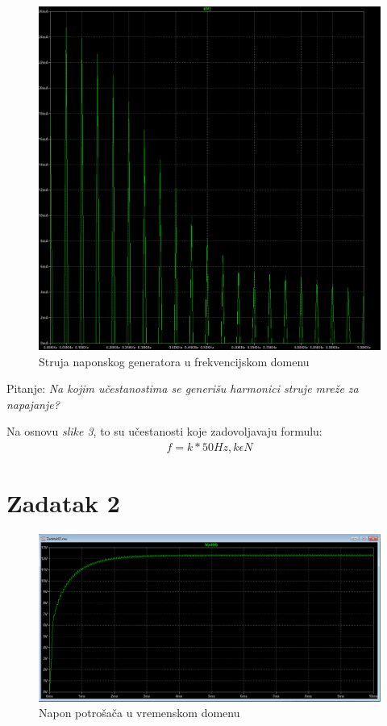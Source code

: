 \documentclass{article}
\begin{document}
\begin{figure}[H]
    \begin{center}
        \includegraphics[width=\textwidth]{Zadatak01_3.png}
        \caption[]{Struja naponskog generatora u frekvencijskom domenu}
    \end{center}
\end{figure}

Pitanje: \emph{Na kojim učestanostima se generišu harmonici struje mreže za napajanje?\\}

Na osnovu \emph{slike 3}, to su učestanosti koje zadovoljavaju formulu:
\begin{align}
    f=k*50Hz, k\epsilon N 
\end{align}


\section*{Zadatak 2}

\begin{figure}[H]
    \begin{center}
        \includegraphics[width=\textwidth]{Zadatak02_1.png}
        \caption[]{Napon potrošača u vremenskom domenu}
    \end{center}
\end{figure}
\end{document}
